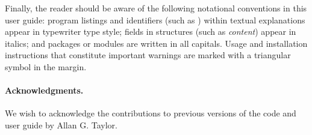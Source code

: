 Finally, the reader should be aware of the following notational
conventions in this user guide:  program listings and identifiers
(such as ) within textual explanations appear in
typewriter type style; fields in {\CC} structures (such as {\em
content}) appear in italics; and packages or modules are written
in all capitals.
Usage and installation instructions that constitute important warnings
are marked with a triangular symbol {\warn} in the margin.

\paragraph{Acknowledgments.}
We wish to acknowledge the contributions to previous versions of the
{\kinsol} code and user guide by Allan G. Taylor.




